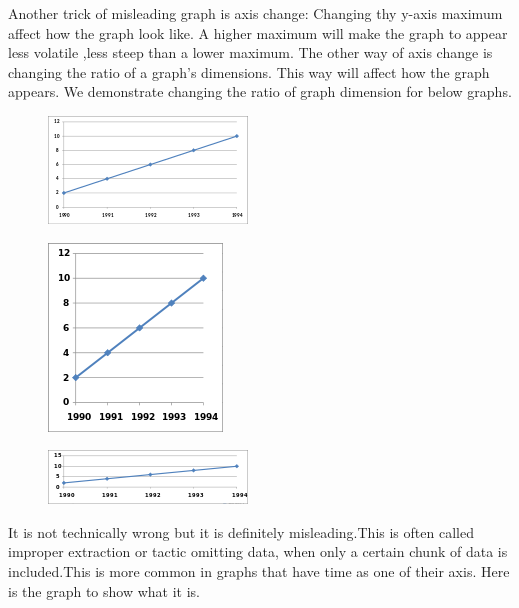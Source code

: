 \documentclass[]{book}
\theoremstyle{definition}
\theoremstyle{definition}
\theoremstyle{definition}
\theoremstyle{remark}
\begin{document}
Another trick of misleading graph is axis change: Changing thy y-axis
maximum affect how the graph look like. A higher maximum will make the
graph to appear less volatile ,less steep than a lower maximum. The
other way of axis change is changing the ratio of a graph's dimensions.
This way will affect how the graph appears. We demonstrate changing the
ratio of graph dimension for below graphs.

\begin{figure}
\centering
\includegraphics{images/Line_graph1.svg.png}
\caption{}
\end{figure}

\begin{figure}
\centering
\includegraphics{images/175px-Line_graph1-3.svg.png}
\caption{}
\end{figure}

\begin{figure}
\centering
\includegraphics{images/200px-Line_graph1-4.svg.png}
\caption{}
\end{figure}

It is not technically wrong but it is definitely misleading.This is
often called improper extraction or tactic omitting data, when only a
certain chunk of data is included.This is more common in graphs that
have time as one of their axis. Here is the graph to show what it is.
\end{document}
